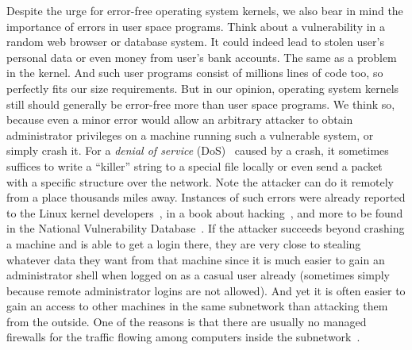 Despite the urge for error-free operating system kernels, we also bear
in mind the importance of errors in user space programs. Think about a
vulnerability in a random web browser or database system.  It could indeed
lead to stolen user's personal data or even money from user's bank accounts.
The same as a problem in the kernel. And such user programs consist of millions
lines of code too, so perfectly fits our size requirements. But in our
opinion, operating system kernels still should generally be error-free more
than user space programs. We think so, because even a minor error would allow
an arbitrary attacker to obtain administrator privileges on a machine running
such a vulnerable system, or simply crash it.  For a \emph{denial of service}
(DoS)~\cite{dos} caused by a crash, it sometimes suffices to write a
``killer'' string to a special file locally or even send a packet with a
specific structure over the network. Note the attacker can do it remotely from
a place thousands miles away.  Instances of such errors were already reported
to the Linux kernel developers~\cite{exploit_vmsplice, exploit_proto_ops,
exploit_userns}, in a book about hacking~\cite[page 256]{hacking}, and more to
be found in the National Vulnerability Database~\cite{nvd}. If the attacker
succeeds beyond crashing a machine and is able to get a login there, they are
very close to stealing whatever data they want from that machine since it is
much easier to gain an administrator shell when logged on as a casual user
already (sometimes simply because remote administrator logins are not
allowed). And yet it is often easier to gain an access to other machines in
the same subnetwork than attacking them from the outside. One of the reasons
is that there are usually no managed firewalls for the traffic flowing among
computers inside the subnetwork~\cite{insider_attack}.

